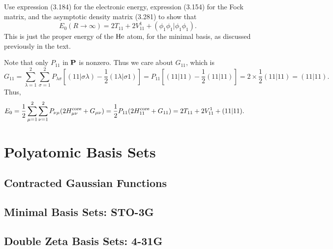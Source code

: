 \documentclass[a4paper]{book}
\newcounter{exercise}[chapter]
\newcounter{solution}[chapter]
\newcommand{\core}{{\rm core}}
\begin{document}
	\begin{exercise}
	Use expression (3.184) for the electronic energy, expression (3.154) for the Fock matrix, and the asymptotic density matrix (3.281) to show that
	\[
		E_0( R \rightarrow \infty ) = 2 T_{11} + 2 V^1_{11} + ( \phi_1 \phi_1 | \phi_1 \phi_1 ).
	\]
	This is just the proper energy of the $\ce{He}$ atom, for the minimal basis, as discussed previously in the text.
	\end{exercise}
	
	\begin{solution}
	
	Note that only $P_{11}$ in ${\bf P}$ is nonzero. Thus we care about $G_{11}$, which is 
	\[
		G_{11} = \sum_{ \lambda=1 }^2 \sum_{ \sigma=1 }^2 P_{\lambda \sigma} \left[ ( 11 | \sigma \lambda ) - \frac{1}{2} ( 1 \lambda | \sigma 1 ) \right] = P_{11} \left[ ( 11 | 11 ) - \frac{1}{2} ( 11 | 11 ) \right] = 2 \times \frac{1}{2} ( 11 | 11 ) = ( 11 | 11 ) .
	\]
	Thus,
	\begin{align*}
		E_0 &= \frac{1}{2} \sum_{ \mu=1 }^2 \sum_{ \nu=1 }^2 P_{ \nu \mu } ( 2 H^\core_{\mu \nu} + G_{\mu \nu} ) = \frac{1}{2} P_{11} ( 2 H^\core_{11} + G_{11} ) = 2 T_{11} + 2 V^1_{11} + ( 11 | 11 ) . 
	\end{align*}
	
	\end{solution}
	
	\section{Polyatomic Basis Sets}
	
	\subsection{Contracted Gaussian Functions}
	
	\subsection{Minimal Basis Sets: STO-3G}
	
	\subsection{Double Zeta Basis Sets: 4-31G}
	
\end{document}
